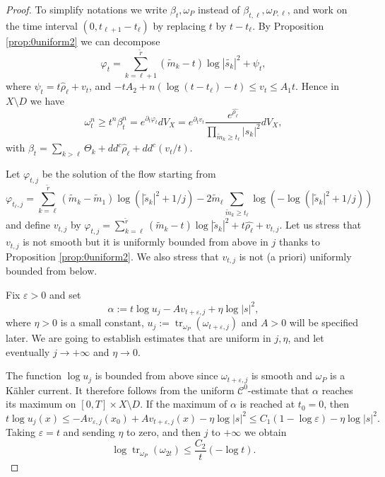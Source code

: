 \documentclass[11pt]{amsart}
\numberwithin{equation}{section}
\newcommand{\f}{\varphi}
\newcommand{\p}{\psi}
\newcommand \e {\varepsilon}
\newcommand{\tr}{\operatorname{tr}}
\begin{document}
\begin{proof} 
To simplify notations we write $\beta_t,\omega_P$ instead of $\beta_{t, \ell},\omega_{P,\ell}$,
and work on the time interval $(0,t_{\ell+1}-t_{\ell})$ by replacing $t$ by $t-t_{\ell}$.
By Proposition \ref{prop:0uniform2} we can decompose
$$
\f_t =\sum_{k=\ell+1}^{\tilde{r}} (\tilde{m}_{k}-t) \log |\tilde{s_k}|^2 +\psi_t,
$$
where  $\p_t=t \hat{\rho}_\ell +v_t$, and 
$
-tA_2  +n(\log (t-t_\ell) -t) \leq v_t \leq A_1t.
$
Hence in $X \setminus D$ we have
$$
\omega_t^n\geq t^n \beta_t^n=e^{\partial_t \f_t} dV_X
=e^{\partial_t v_t} \frac{e^{\hat{\rho_\ell}}}{\prod_{\tilde{m}_k \geq t_\ell}|s_k|^2}dV_X,
$$
with $\beta_t=\sum_{k>\ell} \Theta_k+dd^c {\hat{\rho}_\ell}+dd^c (v_t/t)$.

 \smallskip
 
Let $\varphi_{t,j}$ be the solution of the flow starting from 
$$
\varphi_{t_\ell,j}=\sum_{k=\ell}^{\tilde{r}} (\tilde{m}_{k}-\tilde{m}_{1}) \log (|\tilde{s}_k|^2+1/j) -2\tilde{m}_{\ell}\sum_{ \tilde{m}_{k} \geq t_\ell} \log \left(-\log (|\tilde{s}_k|^2+1/j )\right) 
$$
and define $v_{t,j}$ by $\varphi_{t,j}=\sum_{k=\ell}^{\tilde{r}} (\tilde{m}_{k}-t) \log |\tilde{s}_k|^2 +t \hat{\rho_\ell}+v_{t,j}$. 
Let us stress that $v_{t,j}$ is not smooth but it is uniformly bounded from above in $j$ thanks to Proposition \ref{prop:0uniform2}. 
We also stress that $v_{t,j}$ is not (a priori) uniformly bounded from below.

Fix $\e>0$ and set 
$$
\alpha:=t \log u_j-A v_{t+\e,j}+ \eta \log |s|^2,
$$
 where $\eta>0$ is a small constant, 
$u_j:=\tr_{\omega_P} (\omega_{t+\e,j}) $ and $A>0$ will be specified later. 
We are going to establish estimates that are uniform in $j,\eta$, and let eventually
$j \rightarrow +\infty$ and $\eta \rightarrow 0$.

The function $\log u_j$ is bounded from above since $\omega_{t+\e,j}$ is smooth and $\omega_P$ is a K\"ahler current.
It therefore follows from the uniform ${\mathcal C}^0$-estimate that
$\alpha$ reaches its maximum on $[0,T] \times X \setminus D$.
If the maximum of $\alpha$ is reached at $t_0=0$, then
$$
t \log u_j (x) \leq -A v_{\varepsilon, j}(x_0) + Av_{t+\varepsilon, j}(x) -\eta \log |s|^2
\leq C_1 \left(1 -\log \varepsilon \right)  -\eta \log |s|^2. 
$$
Taking $\varepsilon=t$ and sending $\eta$ to zero, and then $j$ to $+\infty$ we obtain
$$
\log \tr_{\omega_P} (\omega_{2t}) \leq \frac{C_2}{t}(-\log t).  
$$


\end{proof}
\end{document}
